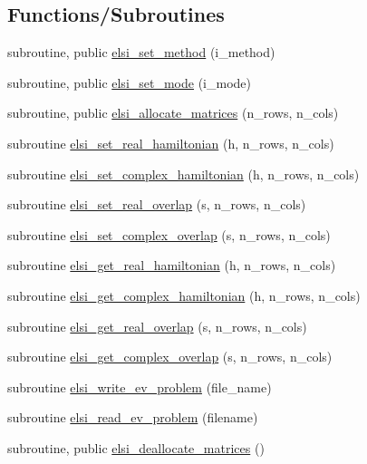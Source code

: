 \subsection*{Functions/\+Subroutines}
\begin{DoxyCompactItemize}
\item 
subroutine, public \hyperlink{namespaceelsi_a783f376d4233c7ddd34506025e9da783}{elsi\+\_\+set\+\_\+method} (i\+\_\+method)
\item 
subroutine, public \hyperlink{namespaceelsi_aae6ed67fce5603d05ec7c9a12e1d2f5e}{elsi\+\_\+set\+\_\+mode} (i\+\_\+mode)
\item 
subroutine, public \hyperlink{namespaceelsi_a2fc97f3c50713d358599bf797f82df6a}{elsi\+\_\+allocate\+\_\+matrices} (n\+\_\+rows, n\+\_\+cols)
\item 
subroutine \hyperlink{namespaceelsi_a3989452ac9aa3b5a6b476b2f62f59aba}{elsi\+\_\+set\+\_\+real\+\_\+hamiltonian} (h, n\+\_\+rows, n\+\_\+cols)
\item 
subroutine \hyperlink{namespaceelsi_a2d89eafea4ad47fa346c6ef89b519e5e}{elsi\+\_\+set\+\_\+complex\+\_\+hamiltonian} (h, n\+\_\+rows, n\+\_\+cols)
\item 
subroutine \hyperlink{namespaceelsi_ac13a9b8801985cf6fe004db0f22a0de1}{elsi\+\_\+set\+\_\+real\+\_\+overlap} (s, n\+\_\+rows, n\+\_\+cols)
\item 
subroutine \hyperlink{namespaceelsi_a9b7229ecd7e605c81633716a1fb07e91}{elsi\+\_\+set\+\_\+complex\+\_\+overlap} (s, n\+\_\+rows, n\+\_\+cols)
\item 
subroutine \hyperlink{namespaceelsi_acc0d017a2182e5d08cf6ffecd5768690}{elsi\+\_\+get\+\_\+real\+\_\+hamiltonian} (h, n\+\_\+rows, n\+\_\+cols)
\item 
subroutine \hyperlink{namespaceelsi_ae8f16797d019c7ac5afd7d2d09d0e22c}{elsi\+\_\+get\+\_\+complex\+\_\+hamiltonian} (h, n\+\_\+rows, n\+\_\+cols)
\item 
subroutine \hyperlink{namespaceelsi_aa47462dda45687624299072ceda001b1}{elsi\+\_\+get\+\_\+real\+\_\+overlap} (s, n\+\_\+rows, n\+\_\+cols)
\item 
subroutine \hyperlink{namespaceelsi_aa4595860c94c26f30313e9d180edaa13}{elsi\+\_\+get\+\_\+complex\+\_\+overlap} (s, n\+\_\+rows, n\+\_\+cols)
\item 
subroutine \hyperlink{namespaceelsi_a71dabe27cfaefe4afe9b6316bfe8905f}{elsi\+\_\+write\+\_\+ev\+\_\+problem} (file\+\_\+name)
\item 
subroutine \hyperlink{namespaceelsi_a45a43fff9aa214be4c6aa6ac348c46c1}{elsi\+\_\+read\+\_\+ev\+\_\+problem} (filename)
\item 
subroutine, public \hyperlink{namespaceelsi_a499852f3083dae7991092915ef2dc5b2}{elsi\+\_\+deallocate\+\_\+matrices} ()
\end{DoxyCompactItemize}
